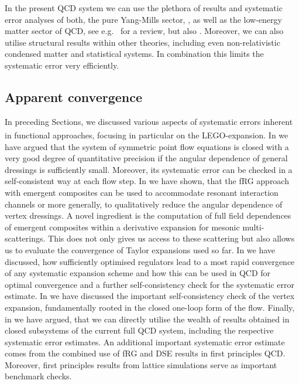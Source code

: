 \documentclass[aps,twocolumn,prd,superscriptaddress]{revtex4-2}
\newcommand{\LEGO}{LEGO\textsuperscript{\textregistered}}
\begin{document}
In the present QCD system we can use the plethora of results and systematic error analyses of both, the pure Yang-Mills sector, \cite{Cyrol:2016tym, Huber:2016tvc, Huber:2017txg, Corell:2018yil, Huber:2020keu, Pawlowski:2022oyq}, as well as the low-energy matter sector of QCD, see e.g.~\cite{Dupuis:2020fhh} for a review, but also \cite{Schaefer:2004en, Kamikado:2012cp, Tripolt:2013zfa, Mitter:2013fxa, Pawlowski:2014zaa, Jiang:2015xqz, Zhang:2017icm, Tripolt:2017zgc, Resch:2017vjs, Yin:2019ebz, Otto:2019zjy, CamaraPereira:2020xla, Otto:2020hoz, Otto:2022jzl}. Moreover, we can also utilise structural results within other theories, including even non-relativistic condensed matter and statistical systems. In combination this limits the systematic error very efficiently.


\subsection{Apparent convergence}
\label{sec:ApparentConvergencesub}

In preceding Sections, we discussed various aspects of systematic errors inherent in functional approaches, focusing in particular on the \LEGO-expansion. In  we have argued that the system of symmetric point flow equations is closed with a very good degree of quantitative precision if the angular dependence of general dressings is sufficiently small. Moreover, its systematic error can be checked in a self-consistent way at each flow step. In  we have shown, that the fRG approach with emergent composites can be used to accommodate resonant interaction channels or more generally, to qualitatively reduce the angular dependence of vertex dressings. A novel ingredient is the computation of full field dependences of emergent composites within a derivative expansion for mesonic multi-scatterings. This does not only gives us access to these scattering but also allows us to evaluate the convergence of Taylor expansions used so far. In  we have discussed, how sufficiently optimised regulators lead to a most rapid convergence of any systematic expansion scheme and how this can be used in QCD for optimal convergence and a further self-consistency check for the systematic error estimate. In  we have discussed the important self-consistency check of the vertex expansion, fundamentally rooted in the closed one-loop form of the flow. Finally, in  we have argued, that we can directly utilise the wealth of results obtained in closed subsystems of the current full QCD system, including the respective systematic error estimates. An additional important systematic error estimate comes from the combined use of fRG and DSE results in first principles QCD. Moreover, first principles results from lattice simulations serve as important benchmark checks. 
\end{document}
